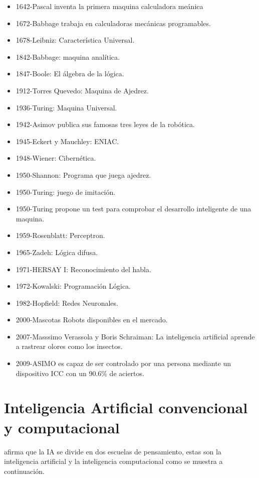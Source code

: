 \begin{itemize}
\item 1642-Pascal inventa la primera maquina calculadora me\'anica
\item 1672-Babbage trabaja en calculadoras mec\'anicas programables.
\item 1678-Leibniz: Caracter\'istica Universal.
\item 1842-Babbage: maquina anal\'itica.
\item 1847-Boole: El \'algebra de la l\'ogica. 
\item 1912-Torres Quevedo: Maquina de Ajedrez.
\item 1936-Turing: Maquina Universal.
\item 1942-Asimov publica sus famosas tres leyes de la rob\'otica.
\item 1945-Eckert y Mauchley: ENIAC.
\item 1948-Wiener: Cibern\'etica.
\item 1950-Shannon: Programa que juega ajedrez.
\item 1950-Turing: juego de imitaci\'on.
\item 1950-Turing propone un test para comprobar el desarrollo inteligente de una  maquina.
\item 1959-Rosenblatt: Perceptron.
\item 1965-Zadeh: L\'ogica difusa.
\item 1971-HERSAY I: Reconocimiento del habla.
\item 1972-Kowalski: Programaci\'on Lógica.
\item 1982-Hopfield: Redes Neuronales.
\item 2000-Mascotas Robots disponibles en el mercado. 
\item 2007-Masssimo Verassola y Boris Schraiman: La inteligencia artificial aprende a rastrear olores como los insectos.
\item 2009-ASIMO es capaz de ser controlado por una persona mediante un dispositivo ICC con un 90.6\% de aciertos.
\end{itemize}

\section{Inteligencia Artificial convencional y computacional}

\cite{convencional_computaciona} afirma que la IA se divide en dos escuelas de pensamiento, estas son la inteligencia artificial y la inteligencia computacional como se muestra a continuaci\'on.

